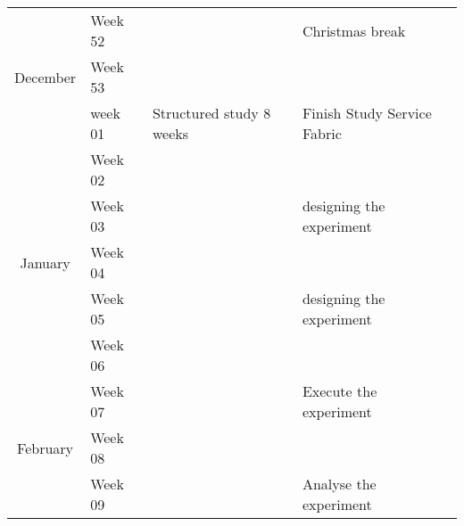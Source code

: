 \documentclass[
  a4paper,  %
  twoside,  %
  bibliography=totoc,
  headsepline,
  cleardoublepage=empty,
  parskip=half,
  draft=false
]{scrbook}
\begin{document}
\begin{tabular}{clll}
                                & Week 52      &                                             & \multirow{-2}{*}{ Christmas break}                                            \\
\multirow{-5}{*}{December}      & Week 53      &                                             &                                                                                                                            \\
                                & week 01      &  \multirow{-10}{*}{Structured study 8 weeks} & \multirow{-2}{*}{Finish Study Service Fabric}                                                                              \\
                                & Week 02      &                                             &                                                                                                                            \\
                                & Week 03      &                                             & \multirow{-2}{*}{designing the experiment}                                                                                 \\
\multirow{-4}{*}{January}       & Week 04      &                                             &                                                                                                                            \\
                                & Week 05      &                                             & \multirow{-2}{*}{designing the experiment}                                                                                 \\
                                & Week 06      &                                             &                                                                                                                            \\
                                & Week 07      &                                             & \multirow{-2}{*}{Execute the experiment}                                                                                   \\
\multirow{-4}{*}{February}      & Week 08      &                                             &                                                                                                                            \\
                                & Week 09      &                                             & \multirow{-2}{*}{Analyse the experiment}                                                                                   \\

\end{tabular}
\end{document}
